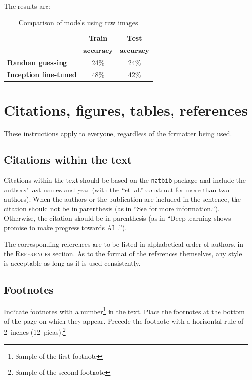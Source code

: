\documentclass{article} %
\begin{document}
The results are:
\begin{table}[H]
\caption{Comparison of models using raw images}
\begin{center}
    \begin{tabular}{| l | c | c |}
    \hline
    & \textbf{Train} & \textbf{Test} \\
    & \textbf{accuracy} & \textbf{accuracy} \\ \hline
    \textbf{Random guessing} & 24\% & 24\% \\ \hline
    \textbf{Inception fine-tuned}  & 48\% & 42\% \\
    \hline
    \end{tabular}
\end{center} 
\end{table}


\section{Citations, figures, tables, references}
\label{others}

These instructions apply to everyone, regardless of the formatter being used.

\subsection{Citations within the text}

Citations within the text should be based on the \texttt{natbib} package
and include the authors' last names and year (with the ``et~al.'' construct
for more than two authors). When the authors or the publication are
included in the sentence, the citation should not be in parenthesis (as
in ``See \citet{Hinton06} for more information.''). Otherwise, the citation
should be in parenthesis (as in ``Deep learning shows promise to make progress towards AI~\citep{Bengio+chapter2007}.'').

The corresponding references are to be listed in alphabetical order of
authors, in the \textsc{References} section. As to the format of the
references themselves, any style is acceptable as long as it is used
consistently.

\subsection{Footnotes}

Indicate footnotes with a number\footnote{Sample of the first footnote} in the
text. Place the footnotes at the bottom of the page on which they appear.
Precede the footnote with a horizontal rule of 2~inches
(12~picas).\footnote{Sample of the second footnote}
\end{document}
